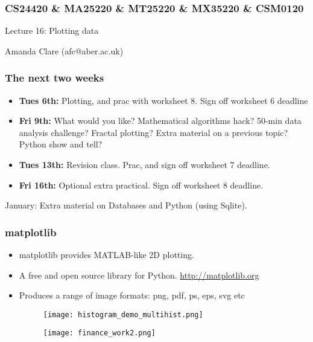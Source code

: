 \documentclass{beamer}
\begin{document}

\begin{frame}
\frametitle{CS24420 \& MA25220 \& MT25220 \& MX35220 \& CSM0120}

\begin{center}
\begin{huge}
Lecture 16: Plotting data
\end{huge}
\bigskip

Amanda Clare (afc@aber.ac.uk)

\end{center}
\end{frame}

\begin{frame}[fragile]
\frametitle{The next two weeks}
\begin{itemize}
\item \textbf{Tues 6th:} Plotting, and prac with worksheet 8. Sign off worksheet 6 deadline
\item \textbf{Fri 9th:} What would you like? Mathematical algorithms
  hack? 50-min data
  analysis challenge? Fractal plotting? Extra material on a previous topic? Python show and tell? 
\item \textbf{Tues 13th:} Revision class. Prac, and sign off worksheet 7 deadline.
\item \textbf{Fri 16th:} Optional extra practical. Sign off worksheet 8 deadline.
\end{itemize}
January: Extra material on Databases and Python (using Sqlite).
\end{frame}


\begin{frame}[fragile]
\frametitle{matplotlib}
\begin{itemize}
\item matplotlib provides MATLAB-like 2D plotting.
\item A free and open source library for Python. \url{http://matplotlib.org}
\item Produces a range of image formats: png, pdf, ps, eps, svg etc
\begin{figure}
        \centering
        \begin{minipage}{.5\textwidth}
            \centering
            \texttt{[image: histogram\_demo\_multihist.png]}
       \end{minipage}%
        \begin{minipage}{.5\textwidth}
            \centering
            \texttt{[image: finance\_work2.png]}
       \end{minipage}
   \end{figure}
\end{itemize}

\end{frame}
\end{document}
